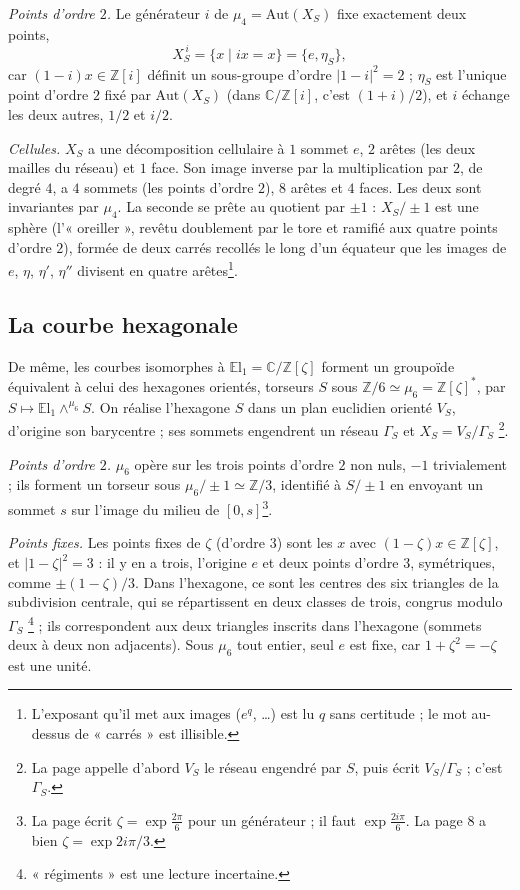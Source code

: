 \documentclass[11pt,a4paper]{article}
\begin{document}
\emph{Points d'ordre $2$.} Le générateur $i$ de $\mu_4 = \mathrm{Aut}(X_S)$ fixe
exactement deux points,
\[
X_S^{\,i} = \{ x \mid ix = x \} = \{ e, \eta_S \},
\]
car $(1 - i)x \in \mathbb{Z}[i]$ définit un sous-groupe d'ordre $|1-i|^2 = 2$ ;
$\eta_S$ est l'unique point d'ordre $2$ fixé par $\mathrm{Aut}(X_S)$ (dans
$\mathbb{C}/\mathbb{Z}[i]$, c'est $(1+i)/2$), et $i$ échange les deux autres,
$1/2$ et $i/2$.

\emph{Cellules.} $X_S$ a une décomposition cellulaire à $1$ sommet $e$, $2$
arêtes (les deux mailles du réseau) et $1$ face. Son image inverse par la
multiplication par $2$, de degré $4$, a $4$ sommets (les points d'ordre $2$),
$8$ arêtes et $4$ faces. Les deux sont invariantes par $\mu_4$. La seconde se
prête au quotient par $\pm 1$ : $X_S/\pm 1$ est une sphère (l'« oreiller »,
revêtu doublement par le tore et ramifié aux quatre points d'ordre $2$),
formée de deux carrés recollés le long d'un équateur que les images de $e$,
$\eta$, $\eta'$, $\eta''$ divisent en quatre arêtes\footnote{L'exposant
qu'il met aux images ($e^{q}$, \ldots) est lu $q$ sans certitude ; le mot
au-dessus de « carrés » est illisible.}.

\subsection*{La courbe hexagonale}

De même, les courbes isomorphes à $\mathbb{E}\mathrm{l}_1 =
\mathbb{C}/\mathbb{Z}[\zeta]$ forment un groupoïde équivalent à celui des
hexagones orientés, torseurs $S$ sous $\mathbb{Z}/6 \simeq \mu_6 =
\mathbb{Z}[\zeta]^{*}$, par $S \mapsto \mathbb{E}\mathrm{l}_1 \wedge^{\mu_6} S$.
On réalise l'hexagone $S$ dans un plan euclidien orienté $V_S$, d'origine son
barycentre ; ses sommets engendrent un réseau $\Gamma_S$ et $X_S = V_S/\Gamma_S$
\footnote{La page appelle d'abord $V_S$ le réseau engendré par $S$, puis écrit
$V_S/\Gamma_S$ ; c'est $\Gamma_S$.}.

\emph{Points d'ordre $2$.} $\mu_6$ opère sur les trois points d'ordre $2$ non
nuls, $-1$ trivialement ; ils forment un torseur sous $\mu_6/\pm 1 \simeq
\mathbb{Z}/3$, identifié à $S/\pm 1$ en envoyant un sommet $s$ sur l'image du
milieu de $[0, s]$\footnote{La page écrit $\zeta = \exp\frac{2\pi}{6}$ pour un
générateur ; il faut $\exp\frac{2i\pi}{6}$. La page 8 a bien $\zeta = \exp
2i\pi/3$.}.

\emph{Points fixes.} Les points fixes de $\zeta$ (d'ordre $3$) sont les $x$ avec
$(1 - \zeta)x \in \mathbb{Z}[\zeta]$, et $|1 - \zeta|^2 = 3$ : il y en a trois,
l'origine $e$ et deux points d'ordre $3$, symétriques, comme $\pm(1 - \zeta)/3$.
Dans l'hexagone, ce sont les centres des six triangles de la subdivision
centrale, qui se répartissent en deux classes de trois, congrus modulo $\Gamma_S$
\footnote{« régiments » est une lecture incertaine.} ; ils correspondent aux
deux triangles inscrits dans l'hexagone (sommets deux à deux non adjacents).
Sous $\mu_6$ tout entier, seul $e$ est fixe, car $1 + \zeta^2 = -\zeta$ est une
unité.
\end{document}

